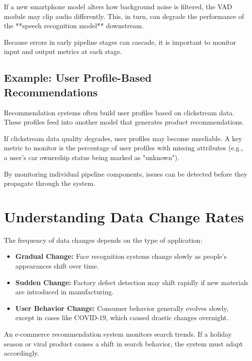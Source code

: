 \documentclass[12pt,openany]{book}
\begin{document}
\begin{examplebox}
   If a new smartphone model alters how background noise is filtered, the VAD module may clip audio differently. This, in turn, can degrade the performance of the **speech recognition model** downstream.
\end{examplebox}

Because errors in early pipeline stages can cascade, it is important to monitor input and output metrics at each stage.


\subsection{Example: User Profile-Based Recommendations}

Recommendation systems often build user profiles based on clickstream data. These profiles feed into another model that generates product recommendations.

\begin{examplebox}
   If clickstream data quality degrades, user profiles may become unreliable. A key metric to monitor is the percentage of user profiles with missing attributes (e.g., a user's car ownership status being marked as "unknown").
\end{examplebox}

By monitoring individual pipeline components, issues can be detected before they propagate through the system.



\section{Understanding Data Change Rates}

The frequency of data changes depends on the type of application:

\begin{itemize}
    \item \textbf{Gradual Change:} Face recognition systems change slowly as people's appearances shift over time.
    \item \textbf{Sudden Change:} Factory defect detection may shift rapidly if new materials are introduced in manufacturing.
    \item \textbf{User Behavior Change:} Consumer behavior generally evolves slowly, except in cases like COVID-19, which caused drastic changes overnight.
\end{itemize}

\begin{examplebox}
   An e-commerce recommendation system monitors search trends. If a holiday season or viral product causes a shift in search behavior, the system must adapt accordingly.
\end{examplebox}
\end{document}
